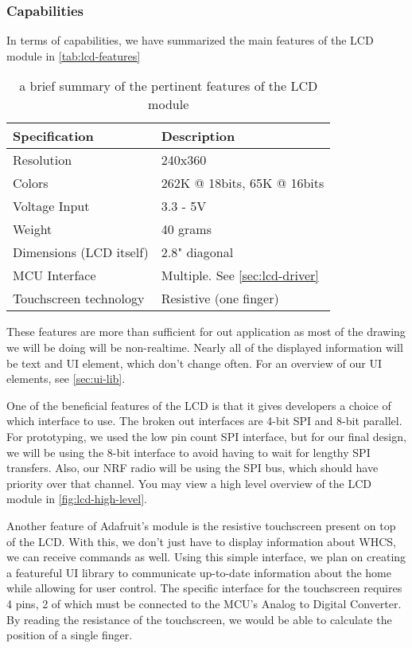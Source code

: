 
\subsubsection{Capabilities}
In terms of capabilities, we have summarized the main features of the LCD module in \autoref{tab:lcd-features}

\begin{table}[H]
\centering
\begin{tabular}{|l|l|}
\hline
\bfseries Specification & \bfseries Description \\ \hline
Resolution & 240x360 \\ \hline
Colors & 262K @ 18bits, 65K @ 16bits \\ \hline
Voltage Input & 3.3 - 5V \\ \hline
Weight & 40 grams \\ \hline
Dimensions (LCD itself) & 2.8" diagonal \\ \hline
MCU Interface & Multiple. See \autoref{sec:lcd-driver}\\ \hline
Touchscreen technology & Resistive (one finger)\\
\hline
\end{tabular}
\caption{a brief summary of the pertinent features of the LCD module}
\label{tab:lcd-features}
\end{table}

These features are more than sufficient for out application as most of the
drawing we will be doing will be non-realtime. Nearly all of the displayed
information will be text and UI element, which don't change often. For an
overview of our UI elements, see \autoref{sec:ui-lib}.

One of the beneficial features of the LCD is that it gives developers a choice
of which interface to use. The broken out interfaces are 4-bit SPI and 8-bit
parallel. For prototyping, we used the low pin count SPI interface, but for our
final design, we will be using the 8-bit interface to avoid having to wait for
lengthy SPI transfers. Also, our NRF radio will be using the SPI bus, which
should have priority over that channel. You may view a high level overview of
the LCD module in \autoref{fig:lcd-high-level}.


Another feature of Adafruit's module is the resistive touchscreen present on top of the
LCD. With this, we don't just have to display information about WHCS, we can
receive commands as well. Using this simple interface, we plan on creating a
featureful UI library to communicate up-to-date information about the home
while allowing for user control. The specific interface for the touchscreen
requires 4 pins, 2 of which must be connected to the MCU's Analog to Digital
Converter. By reading the resistance of the touchscreen, we would be able to
calculate the position of a single finger.

